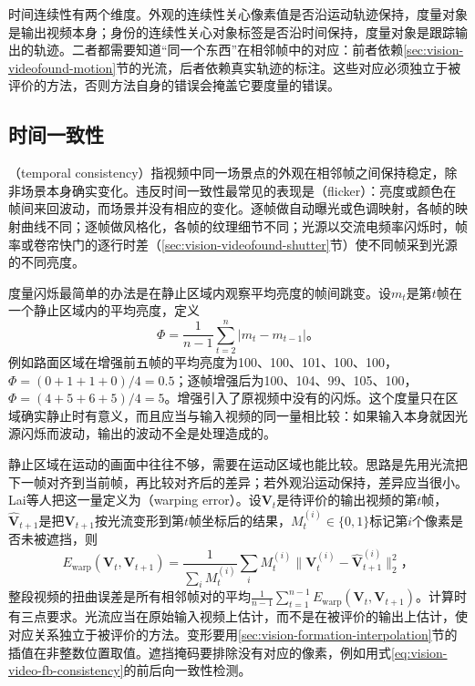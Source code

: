 时间连续性有两个维度。外观的连续性关心像素值是否沿运动轨迹保持，度量对象是输出视频本身；身份的连续性关心对象标签是否沿时间保持，度量对象是跟踪输出的轨迹。二者都需要知道“同一个东西”在相邻帧中的对应：前者依赖\ref{sec:vision-videofound-motion}节的光流，后者依赖真实轨迹的标注。这些对应必须独立于被评价的方法，否则方法自身的错误会掩盖它要度量的错误。

\subsection{时间一致性}
\label{sec:vision-videofound-temporal-consistency}

（temporal consistency）指视频中同一场景点的外观在相邻帧之间保持稳定，除非场景本身确实变化。违反时间一致性最常见的表现是（flicker）：亮度或颜色在帧间来回波动，而场景并没有相应的变化。逐帧做自动曝光或色调映射，各帧的映射曲线不同；逐帧做风格化，各帧的纹理细节不同；光源以交流电频率闪烁时，帧率或卷帘快门的逐行时差（\ref{sec:vision-videofound-shutter}节）使不同帧采到光源的不同亮度。

度量闪烁最简单的办法是在静止区域内观察平均亮度的帧间跳变。设$m_t$是第$t$帧在一个静止区域内的平均亮度，定义
\begin{equation}
  \Phi=\frac{1}{n-1}\sum_{t=2}^{n}\bigl|m_t-m_{t-1}\bigr|\text{。}
  \label{eq:vision-videofound-flicker}
\end{equation}
例如路面区域在增强前五帧的平均亮度为100、100、101、100、100，$\Phi=(0+1+1+0)/4=0.5$；逐帧增强后为100、104、99、105、100，$\Phi=(4+5+6+5)/4=5$。增强引入了原视频中没有的闪烁。这个度量只在区域确实静止时有意义，而且应当与输入视频的同一量相比较：如果输入本身就因光源闪烁而波动，输出的波动不全是处理造成的。

静止区域在运动的画面中往往不够，需要在运动区域也能比较。思路是先用光流把下一帧对齐到当前帧，再比较对齐后的差异；若外观沿运动保持，差异应当很小。Lai等人把这一量定义为（warping error）。设$\bm V_t$是待评价的输出视频的第$t$帧，$\widehat{\bm V}_{t+1}$是把$\bm V_{t+1}$按光流变形到第$t$帧坐标后的结果，$M_t^{(i)}\in\{0,1\}$标记第$i$个像素是否未被遮挡，则
\begin{equation}
  E_{\mathrm{warp}}(\bm V_t,\bm V_{t+1})
  =\frac{1}{\sum_{i}M_t^{(i)}}\sum_{i}M_t^{(i)}
  \bigl\lVert\bm V_t^{(i)}-\widehat{\bm V}_{t+1}^{(i)}\bigr\rVert_2^2\text{，}
  \label{eq:vision-videofound-warping-error}
\end{equation}
整段视频的扭曲误差是所有相邻帧对的平均$\frac{1}{n-1}\sum_{t=1}^{n-1}E_{\mathrm{warp}}(\bm V_t,\bm V_{t+1})$。计算时有三点要求。光流应当在原始输入视频上估计，而不是在被评价的输出上估计，使对应关系独立于被评价的方法。变形要用\ref{sec:vision-formation-interpolation}节的插值在非整数位置取值。遮挡掩码要排除没有对应的像素，例如用式\eqref{eq:vision-video-fb-consistency}的前后向一致性检测。

